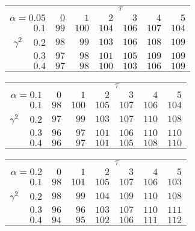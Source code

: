 \begin{tabular}{r|rrrrrr}
\hline\hline
 &\multicolumn{6}{c}{$\tau$} \\ 
 $\alpha = 0.05$ & $0$ & $1$ & $2$ & $3$ & $4$ & $5$ \\ 
 \hline$0.1$ & $ 99$ & $100$ & $104$ & $106$ & $107$ & $104$\\ 
$\gamma^2\;\;\;$ $0.2$ & $ 98$ & $ 99$ & $103$ & $106$ & $108$ & $109$\\ 
$0.3$ & $ 97$ & $ 98$ & $101$ & $105$ & $109$ & $109$\\ 
$0.4$ & $ 97$ & $ 98$ & $100$ & $103$ & $106$ & $109$\\ 
 \hline 
 \end{tabular}
 
 \vspace{2em} 
 
\begin{tabular}{r|rrrrrr}
\hline\hline
 &\multicolumn{6}{c}{$\tau$} \\ 
 $\alpha = 0.1$ & $0$ & $1$ & $2$ & $3$ & $4$ & $5$ \\ 
 \hline$0.1$ & $ 98$ & $100$ & $105$ & $107$ & $106$ & $104$\\ 
$\gamma^2\;\;\;$ $0.2$ & $ 97$ & $ 99$ & $103$ & $107$ & $110$ & $108$\\ 
$0.3$ & $ 96$ & $ 97$ & $101$ & $106$ & $110$ & $110$\\ 
$0.4$ & $ 96$ & $ 97$ & $101$ & $105$ & $108$ & $110$\\ 
 \hline 
 \end{tabular}
 
 \vspace{2em} 
 
\begin{tabular}{r|rrrrrr}
\hline\hline
 &\multicolumn{6}{c}{$\tau$} \\ 
 $\alpha = 0.2$ & $0$ & $1$ & $2$ & $3$ & $4$ & $5$ \\ 
 \hline$0.1$ & $ 98$ & $101$ & $105$ & $107$ & $106$ & $103$\\ 
$\gamma^2\;\;\;$ $0.2$ & $ 98$ & $ 99$ & $104$ & $109$ & $110$ & $108$\\ 
$0.3$ & $ 96$ & $ 96$ & $103$ & $107$ & $110$ & $111$\\ 
$0.4$ & $ 94$ & $ 95$ & $102$ & $106$ & $111$ & $112$\\ 
 \hline 
 \end{tabular}